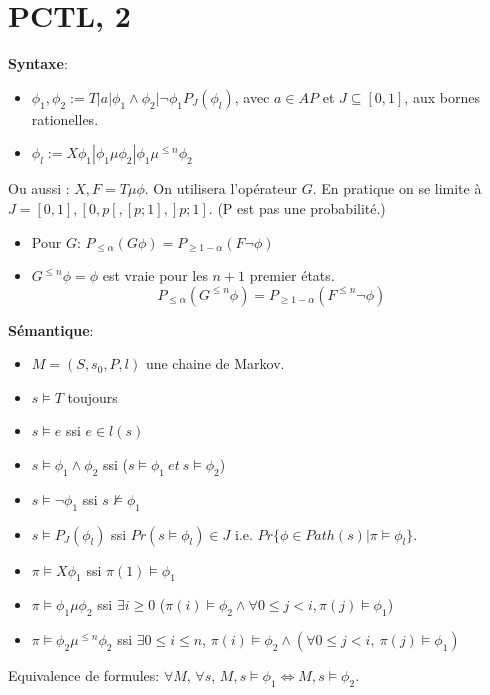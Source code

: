 \documentclass[12pt]{article}
\theoremstyle{plain}
\theoremstyle{definition}
\theoremstyle{remark}
\begin{document}
\section{PCTL, 2}
\textbf{Syntaxe}:
\begin{itemize}
    \item $\phi_1,\phi_2:= T| a| \phi_1\wedge \phi_2|\neg \phi_1
    P_J(\phi_l)$, avec $a\in AP$ et $J\subseteq [0,1]$, aux bornes rationelles.
    \item $\phi_l:= X\phi_1|\phi_1\mu \phi_2 | \phi_1 \mu^{\leq n}\phi_2$
\end{itemize}
Ou aussi : $X, F=T\mu \phi$. On utilisera l'opérateur $G$.
En pratique on se limite à $J=[0,1],[0,p[,[p;1], ]p;1]$. (P est 
pas une probabilité.)

\begin{itemize}
    \item Pour $G$: 
    $P_{\leq \alpha}(G\phi)=P_{\geq 1-\alpha}(F\neg\phi)$
    \item $G^{\leq n}\phi=\phi$ est vraie pour les $n+1$
    premier états. 
    \[P_{\leq \alpha}(G^{\leq n}\phi)=
    P_{\geq 1-\alpha}(F^{\leq n}\neg \phi)\]
\end{itemize}
\textbf{Sémantique}:
\begin{itemize}
    \item $M=(S,s_0, P, l)$ une chaine de Markov.
    \item $s\vDash T$ toujours
    \item $s\vDash e$ ssi $e\in l(s)$
    \item $s\vDash \phi_1\wedge \phi_2$ ssi ($s\vDash \phi_1~et~s\vDash \phi_2$)
    \item $s\vDash \neg \phi_1$ ssi $s\nvDash \phi_1$
    \item $s\vDash P_J(\phi_l)$ ssi $Pr(s\vDash \phi_l)\in J$
    i.e. $Pr\{\phi\in Path(s)|\pi\vDash \phi_l\}$.
    \item $\pi\vDash X\phi_1$ ssi $\pi(1)\vDash \phi_1$
    \item $\pi\vDash \phi_1\mu \phi_2$ ssi $\exists i\geq 0$
    ($\pi(i)\vDash \phi_2 \wedge \forall 0\leq j<i, \pi(j)\vDash \phi_1$)
    \item $\pi\vDash \phi_2\mu^{\leq n}\phi_2$ ssi 
    $\exists 0\leq i\leq n$, $\pi(i)\vDash \phi_2 \wedge 
    (\forall 0\leq j<i,~\pi(j)\vDash \phi_1)$

\end{itemize}

Equivalence de formules: $\forall M$, $\forall s$,
 $M,s\vDash \phi_1\Leftrightarrow M,s\vDash \phi_2$.
\end{document}
